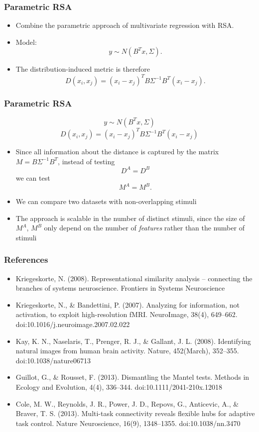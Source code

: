 \documentclass{beamer}
\begin{document}
\begin{frame}
\frametitle{Parametric RSA}
\begin{itemize}
\item Combine the parametric approach of multivariate regression with RSA.
\item Model:
\[
y \sim N(B^T x, \Sigma).
\]
\item The distribution-induced metric is therefore
\[
D(x_i, x_j) = (x_i - x_j)^T B \Sigma^{-1} B^T (x_i - x_j).
\]
\end{itemize}
\end{frame}

\begin{frame}
\frametitle{Parametric RSA}
\[
y \sim N(B^T x, \Sigma)
\]
\[
D(x_i, x_j) = (x_i - x_j)^T B \Sigma^{-1} B^T (x_i - x_j)
\]
\begin{itemize}
\item Since all information about the distance is captured by the matrix $M = B\Sigma^{-1}B^T$, instead of testing
\[
D^A = D^B
\]
we can test
\[
M^A = M^B.
\]
\item We can compare two datasets with non-overlapping stimuli
\item The approach is scalable in the number of distinct stimuli,
  since the size of $M^A$, $M^B$ only depend on the number of
  \emph{features} rather than the number of stimuli
\end{itemize}
\end{frame}

\begin{frame}
\frametitle{References}
\begin{itemize}
\item Kriegeskorte, N. (2008). Representational similarity analysis – connecting the branches of systems neuroscience. Frontiers in Systems Neuroscience
\item Kriegeskorte, N., \& Bandettini, P. (2007). Analyzing for information, not activation, to exploit high-resolution fMRI. NeuroImage, 38(4), 649–662. doi:10.1016/j.neuroimage.2007.02.022
\item Kay, K. N., Naselaris, T., Prenger, R. J., \& Gallant, J. L. (2008). Identifying natural images from human brain activity. Nature, 452(March), 352–355. doi:10.1038/nature06713
\item Guillot, G., \& Rousset, F. (2013). Dismantling the Mantel tests. Methods in Ecology and Evolution, 4(4), 336–344. doi:10.1111/2041-210x.12018
\item Cole, M. W., Reynolds, J. R., Power, J. D., Repovs, G., Anticevic, A., \& Braver, T. S. (2013). Multi-task connectivity reveals flexible hubs for adaptive task control. Nature Neuroscience, 16(9), 1348–1355. doi:10.1038/nn.3470
\end{itemize}
\end{frame}
\end{document}
